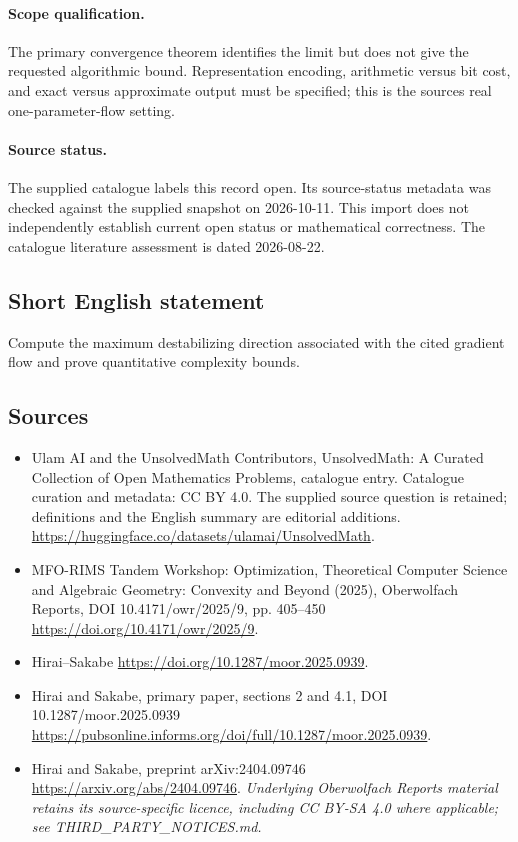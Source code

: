 \documentclass[11pt]{article}
\begin{document}
\paragraph{Scope qualification.}
The primary convergence theorem identifies the limit but does not give the requested algorithmic bound. Representation encoding, arithmetic versus bit cost, and exact versus approximate output must be specified; this is the source\textquotesingle s real one-parameter-flow setting.
\paragraph{Source status.}
The supplied catalogue labels this record open. Its source-status metadata was checked against the supplied snapshot on 2026-10-11. This import does not independently establish current open status or mathematical correctness. The catalogue literature assessment is dated 2026-08-22.
\subsection{Short English statement}
Compute the maximum destabilizing direction associated with the cited gradient flow and prove quantitative complexity bounds.
\subsection{Sources}
\begin{itemize}
\item[S1] Ulam AI and the UnsolvedMath Contributors, UnsolvedMath: A Curated Collection of Open Mathematics Problems, catalogue entry. Catalogue curation and metadata: CC BY 4.0. The supplied source question is retained; definitions and the English summary are editorial additions.
\url{https://huggingface.co/datasets/ulamai/UnsolvedMath}.
\item[S2] MFO-RIMS Tandem Workshop: Optimization, Theoretical Computer Science and Algebraic Geometry: Convexity and Beyond (2025), Oberwolfach Reports, DOI 10.4171/owr/2025/9, pp. 405--450
\url{https://doi.org/10.4171/owr/2025/9}.
\item[S3] Hirai--Sakabe
\url{https://doi.org/10.1287/moor.2025.0939}.
\item[S4] Hirai and Sakabe, primary paper, sections 2 and 4.1, DOI 10.1287/moor.2025.0939
\url{https://pubsonline.informs.org/doi/full/10.1287/moor.2025.0939}.
\item[S5] Hirai and Sakabe, preprint arXiv:2404.09746
\url{https://arxiv.org/abs/2404.09746}.
\textit{Underlying Oberwolfach Reports material retains its source-specific licence, including CC BY-SA 4.0 where applicable; see THIRD\_PARTY\_NOTICES.md.}
\end{itemize}
\end{document}
